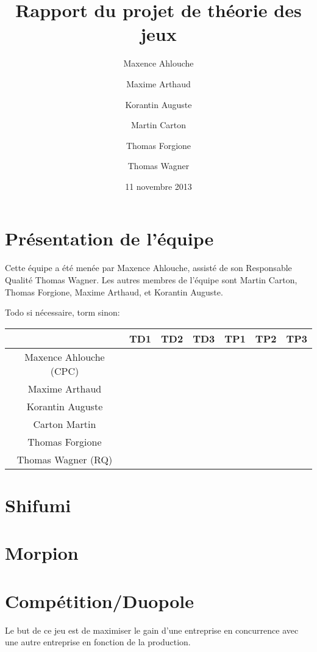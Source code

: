 \documentclass{scrartcl}
\begin{document}
\title{Rapport du projet de théorie des jeux}
\author{Maxence Ahlouche \and Maxime Arthaud \and Korantin Auguste
          \and Martin Carton \and Thomas Forgione \and Thomas Wagner}
\date{11 novembre 2013}
\maketitle
\tableofcontents
\lstlistoflistings
\newpage

\section{Présentation de l'équipe}
  Cette équipe a été menée par Maxence Ahlouche, assisté de son Responsable
  Qualité Thomas Wagner. Les autres membres de l'équipe sont Martin Carton,
  Thomas Forgione, Maxime Arthaud, et Korantin Auguste.

  Todo si nécessaire, torm sinon:
  \begin{table}[h]
    \centering
    \begin{tabular}{|c||c|c|c||c|c|c|}
      \hline
      & TD1 & TD2 & TD3 & TP1 & TP2 & TP3 \\
      \hline\hline
      Maxence Ahlouche (CPC) & & & & & & \\
      \hline
      Maxime Arthaud & & & & & & \\
      \hline
      Korantin Auguste &&&&&& \\
      \hline
      Carton Martin &&&&&&\\
      \hline
      Thomas Forgione &&&&&&\\
      \hline
      Thomas Wagner (RQ) &&&&&&\\
      \hline
    \end{tabular}
  \end{table}

\section{Shifumi}
\section{Morpion}
\section{Compétition/Duopole}
  Le but de ce jeu est de maximiser le gain d'une entreprise en concurrence avec
  une autre entreprise en fonction de la production.
\end{document}
